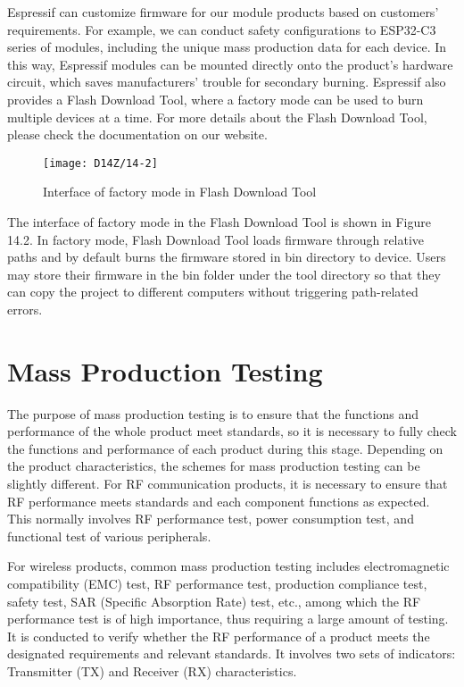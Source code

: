 \documentclass[a4paper,12pt]{book}
\begin{document}
Espressif can customize firmware for our module products based on customers’ requirements. For example, we can conduct safety configurations to ESP32-C3 series of modules, including the unique mass production data for each device. In this way, Espressif modules can be mounted directly onto the product’s hardware circuit, which saves manufacturers’ trouble for secondary burning. Espressif also provides a Flash Download Tool, where a factory mode can be used to burn multiple devices at a time. For more details about the Flash Download Tool, please check the documentation on our website.
\begin{figure}[h!]
    \centering
    \texttt{[image: D14Z/14-2]}
    \caption{Interface of factory mode in Flash Download Tool}
\end{figure}

The interface of factory mode in the Flash Download Tool is shown in Figure 14.2. In factory mode, Flash Download Tool loads firmware through relative paths and by default burns the firmware stored in bin directory to device. Users may store their firmware in the bin folder under the tool directory so that they can copy the project to different computers without triggering path-related errors.

\section{Mass Production Testing}

The purpose of mass production testing is to ensure that the functions and performance of the whole product meet standards, so it is necessary to fully check the functions and performance of each product during this stage. Depending on the product characteristics, the schemes for mass production testing can be slightly different. For RF communication products, it is necessary to ensure that RF performance meets standards and each component functions as expected. This normally involves RF performance test, power consumption test, and functional test of various peripherals.

For wireless products, common mass production testing includes electromagnetic compatibility (EMC) test, RF performance test, production compliance test, safety test, SAR (Specific Absorption Rate) test, etc., among which the RF performance test is of high importance, thus requiring a large amount of testing. It is conducted to verify whether the RF performance of a product meets the designated requirements and relevant standards. It involves two sets of indicators: Transmitter (TX) and Receiver (RX) characteristics.
\end{document}
